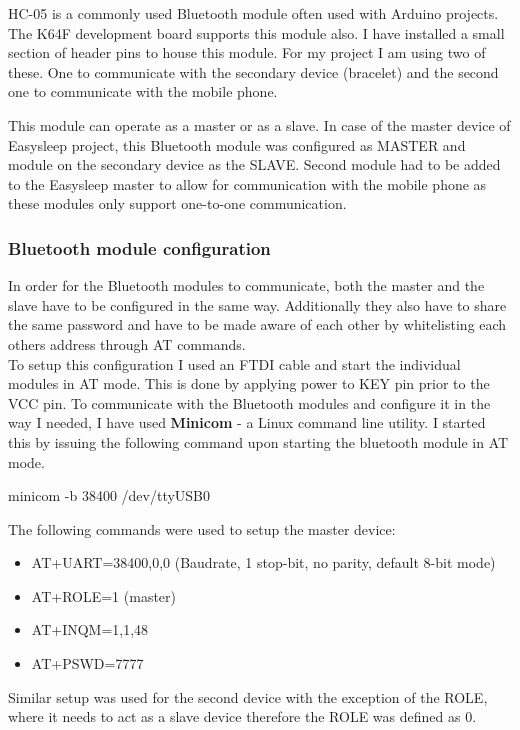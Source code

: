 \documentclass[12pt,a4paper]{article}
\begin{document}
		HC-05 is a commonly used Bluetooth module often used with Arduino projects. The K64F development board supports  
		this module also. I have installed a small section of header pins to house this module. For my  
		project I am using two of these. One to communicate with the secondary device (bracelet) and the
		second one to communicate with the mobile phone.
		
		This module can operate as a master or as a slave. In case of the master device of Easysleep project, this Bluetooth module was configured as MASTER and module on the secondary device as the SLAVE. Second module had to be added to the Easysleep master to allow for communication with the mobile phone as these modules only support one-to-one communication.
		
		\subsubsection{Bluetooth module configuration}
		In order for the Bluetooth modules to communicate, both the master and the slave have to be configured in the same way. Additionally they also have to share the same password and have to be made aware of each other by whitelisting each others address through AT commands.\\ 
		
		To setup this configuration I used an FTDI cable and start the individual modules in AT mode. This is done by applying power to KEY pin prior to the VCC pin. To communicate with the Bluetooth modules and configure it in the way I needed, I have used {\bfseries Minicom}  - a Linux command line utility. I started this by issuing the following command upon starting the bluetooth module in AT mode.
		\begin{center}
		 minicom -b 38400 /dev/ttyUSB0
		\end{center}
		The following commands were used to setup the master device:
		\begin{itemize}
		 \item AT+UART=38400,0,0 (Baudrate, 1 stop-bit, no parity, default 8-bit mode)
		 \item AT+ROLE=1 (master)
		 \item AT+INQM=1,1,48
		 \item AT+PSWD=7777
		\end{itemize}
		Similar setup was used for the second device with the exception of the ROLE, where it needs to act as a slave device therefore the ROLE was defined as 0.
		\newpage
		
\end{document}
